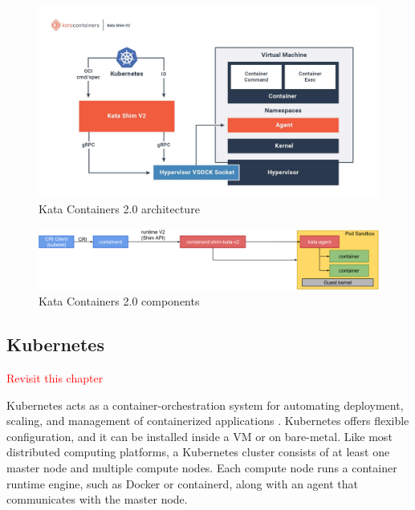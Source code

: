 \begin{figure}[ht]
  \begin{center}
    \includegraphics[width=13.5cm]{images/KataContainersArchitecture.jpg}
    \caption{Kata Containers 2.0 architecture \cite{KataContainers}}
    \label{fig:KataContainersArchitecture}
  \end{center}
\end{figure}

\begin{figure}[ht]
  \begin{center}
    \includegraphics[width=13.5cm]{images/KataContainersComponents.png}
    \caption{Kata Containers 2.0 components \cite{KataContainersArchitecture}}
    \label{fig:KataContainersComponents}
  \end{center}
\end{figure}

\subsection{Kubernetes}
\textcolor{red}{Revisit this chapter}

Kubernetes acts as a container-orchestration system for automating deployment, scaling, and management of containerized applications \cite{Kubernetes}. Kubernetes offers flexible configuration, and it can be installed inside a VM or on bare-metal. Like most distributed computing platforms, a Kubernetes cluster consists of at least one master node and multiple compute nodes. Each compute node runs a container runtime engine, such as Docker or containerd, along with an agent that communicates with the master node.

